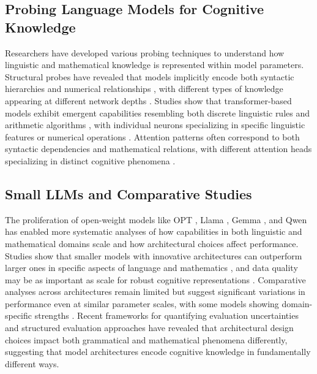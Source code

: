 \documentclass{article}
\begin{document}
\subsection{Probing Language Models for Cognitive Knowledge}
Researchers have developed various probing techniques to understand how linguistic and mathematical knowledge is represented within model parameters. Structural probes have revealed that models implicitly encode both syntactic hierarchies and numerical relationships \citep{hewitt2019structural, wallace2019nlp}, with different types of knowledge appearing at different network depths \citep{tenney2019bert, kim2020interpreting}. Studies show that transformer-based models exhibit emergent capabilities resembling both discrete linguistic rules and arithmetic algorithms \citep{manning2020emergent, power2022moresymbolic}, with individual neurons specializing in specific linguistic features or numerical operations \citep{geva2021transformer, patel2022mapping}. Attention patterns often correspond to both syntactic dependencies and mathematical relations, with different attention heads specializing in distinct cognitive phenomena \citep{clark2019does, kim2020analyzing}.

\subsection{Small LLMs and Comparative Studies}
The proliferation of open-weight models like OPT \citep{zhang2022opt}, Llama \citep{touvron2023llama}, Gemma \citep{team2024gemma}, and Qwen \citep{bai2023qwen} has enabled more systematic analyses of how capabilities in both linguistic and mathematical domains scale and how architectural choices affect performance. Studies show that smaller models with innovative architectures can outperform larger ones in specific aspects of language and mathematics \citep{mckenzie2023inverse}, and data quality may be as important as scale for robust cognitive representations \citep{hoffmann2022empirical}. Comparative analyses across architectures remain limited but suggest significant variations in performance even at similar parameter scales, with some models showing domain-specific strengths \citep{talmor2020olmpics, zhao2023survey}. Recent frameworks for quantifying evaluation uncertainties \citep{roberts2023quantifying} and structured evaluation approaches \citep{xia2023structured} have revealed that architectural design choices impact both grammatical and mathematical phenomena differently, suggesting that model architectures encode cognitive knowledge in fundamentally different ways.
\end{document}
